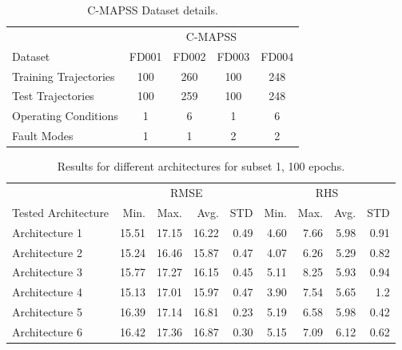 \documentclass[12pt]{IEEEtran}%
\begin{document}
\begin{table}
\begin{center}
\caption{C-MAPSS Dataset details.}%
%

\begin{tabular}
[c]{l|cccc}\hline
& \multicolumn{4}{c}{C-MAPSS}\\
Dataset & FD001 & FD002 & FD003 & FD004\\\hline\hline
Training Trajectories & 100 & 260 & 100 & 248\\
Test Trajectories & 100 & 259 & 100 & 248\\
Operating Conditions & 1 & 6 & 1 & 6\\
Fault Modes & 1 & 1 & 2 & 2\\\hline
\end{tabular}
\label{TabCMAPSS1}%

\end{center}
\end{table}


\begin{table}
\begin{center}
\caption{Results for different architectures for subset 1, 100 epochs.}%
%

\begin{tabular}
[c]{l|rrrr|rrrr}\hline
& \multicolumn{4}{|c}{RMSE} & \multicolumn{4}{|c}{RHS}\\
Tested Architecture & Min. & Max. & Avg. & STD & Min. & Max. & Avg. &
STD\\\hline\hline
Architecture 1 & 15.51 & 17.15 & 16.22 & 0.49 & 4.60 & 7.66 & 5.98 & 0.91\\
Architecture 2 & 15.24 & 16.46 & 15.87 & 0.47 & 4.07 & 6.26 & 5.29 & 0.82\\
Architecture 3 & 15.77 & 17.27 & 16.15 & 0.45 & 5.11 & 8.25 & 5.93 & 0.94\\
Architecture 4 & 15.13 & 17.01 & 15.97 & 0.47 & 3.90 & 7.54 & 5.65 & 1.2\\
Architecture 5 & 16.39 & 17.14 & 16.81 & 0.23 & 5.19 & 6.58 & 5.98 & 0.42\\
Architecture 6 & 16.42 & 17.36 & 16.87 & 0.30 & 5.15 & 7.09 & 6.12 &
0.62\\\hline
\end{tabular}
%
\label{table:tested_architectures_100}
%
\end{center}
\end{table}
\end{document}
